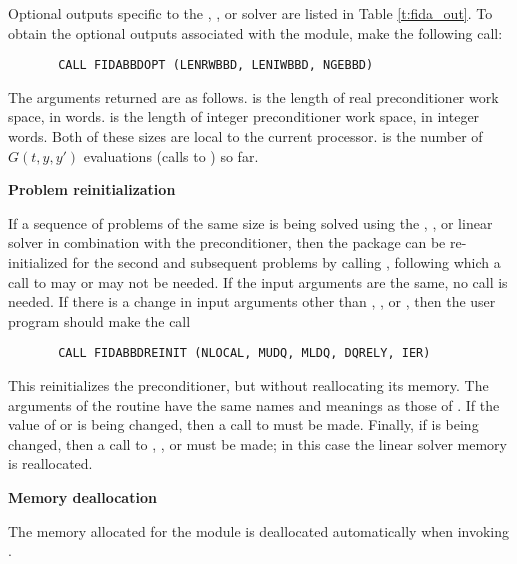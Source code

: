 \begin{Steps}
  Optional outputs specific to the {\spgmr}, {\spbcg}, or {\sptfqmr} solver are 
  listed in Table \ref{t:fida_out}.
  To obtain the optional outputs associated with the {\idabbdpre}
  module, make the following call:
\begin{verbatim}
       CALL FIDABBDOPT (LENRWBBD, LENIWBBD, NGEBBD)
\end{verbatim}
  The arguments returned are as follows.
   is the length of real preconditioner work space, in 
  words.   is the length of integer preconditioner work space, in
  integer words.  Both of these sizes are local to the current processor.
   is the number of $G(t,y,y')$ evaluations (calls to )
  so far.
  
\item {\bf Problem reinitialization}
  
  If a sequence of problems of the same size is being solved using the {\spgmr},
  {\spbcg}, or {\sptfqmr} linear solver in combination with the {\idabbdpre}
  preconditioner, then the {\ida} package can be re-initialized for the second
  and subsequent problems by calling , following which a call
  to  may or  may not be needed.
  If the input arguments are the same, no  call is needed.
  If there is a change in input arguments other than , , or
  , then the user program should make the call 
\begin{verbatim}
       CALL FIDABBDREINIT (NLOCAL, MUDQ, MLDQ, DQRELY, IER)
\end{verbatim}
  This reinitializes the {\idabbdpre} preconditioner, but without
  reallocating its memory.  The arguments of the 
  routine have the same names and meanings as those of .
  If the value of  or  is being changed, then a call to
   must be made.  Finally, if  is being  changed,
  then a call to , , or 
  must be made; in this case the linear solver memory is reallocated.

\item {\bf Memory deallocation}

  The memory allocated for the {\fidabbd} module is deallocated automatically
  when invoking .



\end{Steps}
